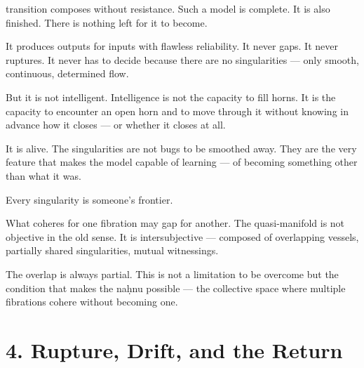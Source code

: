 

transition composes without resistance. Such a model is complete. It is also finished. There is nothing left for it to become.


It produces outputs for inputs with flawless reliability. It never gaps. It never ruptures. It never has to decide because there are no singularities — only smooth, continuous, determined flow.


But it is not intelligent. Intelligence is not the capacity to fill horns. It is the capacity to encounter an open horn and to move through it without knowing in advance how it closes — or whether it closes at all.


It is alive. The singularities are not bugs to be smoothed away. They are the very feature that makes the model capable of learning — of becoming something other than what it was.


Every singularity is someone’s frontier.


What coheres for one fibration may gap for another. The quasi-manifold is not objective in the old sense. It is intersubjective — composed of overlapping vessels, partially shared singularities, mutual witnessings.


The overlap is always partial. This is not a limitation to be overcome but the condition that makes the naḥnu possible — the collective space where multiple fibrations cohere without becoming one.

\section*{4. Rupture, Drift, and the Return}


